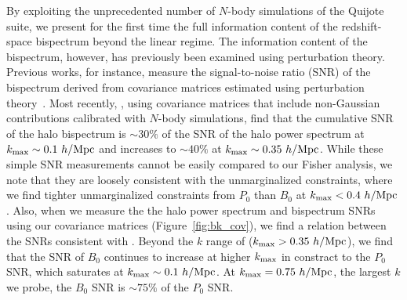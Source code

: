 By exploiting the unprecedented number of $N$-body simulations of the Quijote 
suite, we present for the first time the full information content of the 
redshift-space bispectrum beyond the linear regime. The information content 
of the bispectrum, however, has previously been examined using perturbation 
theory. Previous works, for instance, measure the signal-to-noise ratio (SNR) 
of the bispectrum derived from covariance matrices estimated using perturbation 
theory~\citep[\emph{e.g.}][]{sefusatti2005, chan2017}. Most recently, \cite{chan2017},
using covariance matrices that include non-Gaussian contributions calibrated with 
$N$-body simulations, find that the cumulative SNR of the halo bispectrum is 
$\sim 30\%$ of the SNR of the halo power spectrum at $k_{\rm max} \sim 0.1~h/{\rm Mpc}$ 
and increases to $\sim 40\%$ at $k_{\rm max}\sim 0.35~h/{\rm Mpc}$. While these simple 
SNR measurements cannot be easily compared to our Fisher analysis, we note that 
they are loosely consistent with the unmarginalized constraints, where we find 
tighter unmarginalized constraints from $P_0$ than $B_0$ at $k_{\rm max} < 0.4~h/{\rm Mpc}$. 
Also, when we measure the the halo power spectrum and bispectrum SNRs using our 
covariance matrices (Figure~\ref{fig:bk_cov}), we find a relation between the 
SNRs consistent with \cite{chan2017}. Beyond the $k$ range of \cite{chan2017} 
($k_{\rm max}>0.35~h/{\rm Mpc}$), we find that the SNR of $B_0$ continues to increase 
at higher $k_{\rm max}$ in constract to the $P_0$ SNR, which saturates at 
$k_{\rm max}\sim 0.1~h/{\rm Mpc}$. At $k_{\rm max} = 0.75~h/{\rm Mpc}$, the largest $k$ we 
probe, the $B_0$ SNR is $\sim75\%$ of the $P_0$ SNR.

